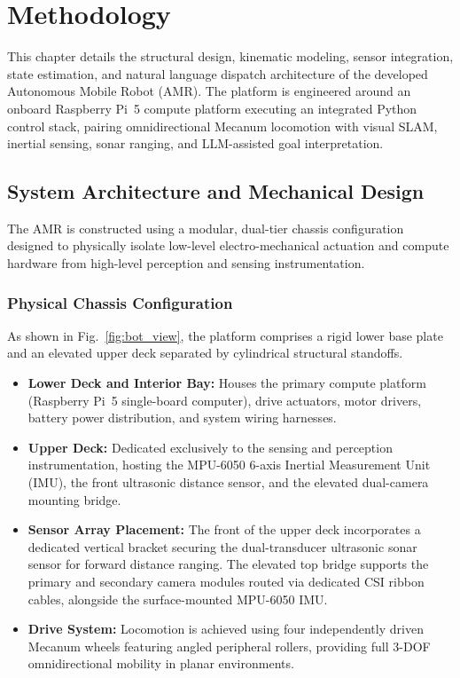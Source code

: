 \chapter{Methodology}
\label{ch:methodology}

This chapter details the structural design, kinematic modeling, sensor integration, state estimation, and natural language dispatch architecture of the developed Autonomous Mobile Robot (AMR). The platform is engineered around an onboard Raspberry Pi~5 compute platform executing an integrated Python control stack, pairing omnidirectional Mecanum locomotion with visual SLAM, inertial sensing, sonar ranging, and LLM-assisted goal interpretation.

\section{System Architecture and Mechanical Design}
The AMR is constructed using a modular, dual-tier chassis configuration designed to physically isolate low-level electro-mechanical actuation and compute hardware from high-level perception and sensing instrumentation.

\subsection{Physical Chassis Configuration}
As shown in Fig.~\ref{fig:bot_view}, the platform comprises a rigid lower base plate and an elevated upper deck separated by cylindrical structural standoffs. 
\begin{itemize}
    \item \textbf{Lower Deck and Interior Bay:} Houses the primary compute platform (Raspberry Pi~5 single-board computer), drive actuators, motor drivers, battery power distribution, and system wiring harnesses.
    \item \textbf{Upper Deck:} Dedicated exclusively to the sensing and perception instrumentation, hosting the MPU-6050 6-axis Inertial Measurement Unit (IMU), the front ultrasonic distance sensor, and the elevated dual-camera mounting bridge.
    \item \textbf{Sensor Array Placement:} The front of the upper deck incorporates a dedicated vertical bracket securing the dual-transducer ultrasonic sonar sensor for forward distance ranging. The elevated top bridge supports the primary and secondary camera modules routed via dedicated CSI ribbon cables, alongside the surface-mounted MPU-6050 IMU.
    \item \textbf{Drive System:} Locomotion is achieved using four independently driven Mecanum wheels featuring angled peripheral rollers, providing full 3-DOF omnidirectional mobility in planar environments.
\end{itemize}

